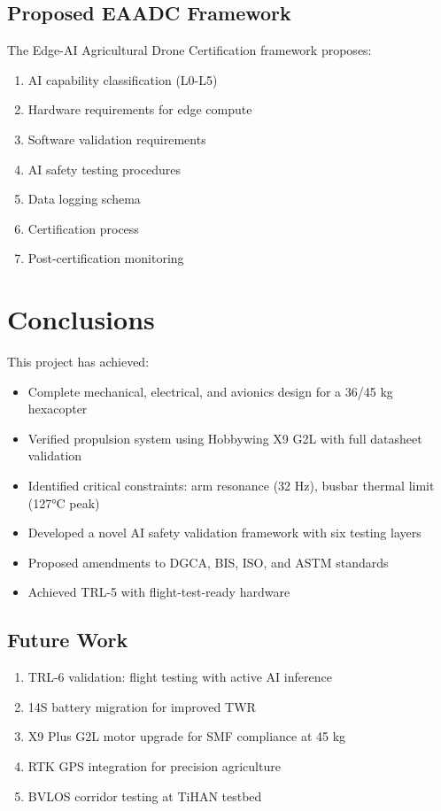 \documentclass[12pt,a4paper]{article}
\begin{document}
\subsection{Proposed EAADC Framework}
The Edge-AI Agricultural Drone Certification framework proposes:
\begin{enumerate}
    \item AI capability classification (L0-L5)
    \item Hardware requirements for edge compute
    \item Software validation requirements
    \item AI safety testing procedures
    \item Data logging schema
    \item Certification process
    \item Post-certification monitoring
\end{enumerate}

\section{Conclusions}

This project has achieved:
\begin{itemize}
    \item Complete mechanical, electrical, and avionics design for a 36/45 kg hexacopter
    \item Verified propulsion system using Hobbywing X9 G2L with full datasheet validation
    \item Identified critical constraints: arm resonance (32 Hz), busbar thermal limit (127°C peak)
    \item Developed a novel AI safety validation framework with six testing layers
    \item Proposed amendments to DGCA, BIS, ISO, and ASTM standards
    \item Achieved TRL-5 with flight-test-ready hardware
\end{itemize}

\subsection{Future Work}
\begin{enumerate}
    \item TRL-6 validation: flight testing with active AI inference
    \item 14S battery migration for improved TWR
    \item X9 Plus G2L motor upgrade for SMF compliance at 45 kg
    \item RTK GPS integration for precision agriculture
    \item BVLOS corridor testing at TiHAN testbed
\end{enumerate}
\end{document}
